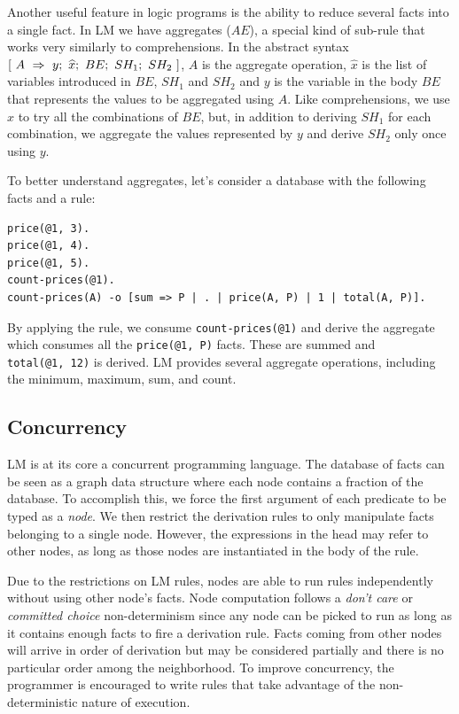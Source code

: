 Another useful feature in logic programs is the ability to reduce several facts into a single fact.
In LM we have aggregates ($AE$), a special kind of sub-rule that works very similarly to comprehensions.
In the abstract syntax $[~A~\Rightarrow~y;~\widehat{x};~BE;~SH_1;~SH_2~]$, $A$ is the aggregate operation, $\widehat{x}$ is the list of variables
introduced in $BE$, $SH_1$ and $SH_2$ and $y$ is the variable in the body
$BE$ that represents the values to be aggregated using $A$. Like comprehensions,
we use $\widehat{x}$ to try all the combinations of $BE$, but, in addition to deriving $SH_1$ for each combination,
we aggregate the values represented by $y$ and derive $SH_2$ only once using $y$.

To better understand aggregates, let's consider a database with the following facts and a rule:

\begin{Verbatim}
price(@1, 3).
price(@1, 4).
price(@1, 5).
count-prices(@1).
count-prices(A) -o [sum => P | . | price(A, P) | 1 | total(A, P)].
\end{Verbatim}

By applying the rule, we consume \texttt{count-prices(@1)} and
derive the aggregate which consumes all the \texttt{price(@1, P)} facts.
These are summed and \texttt{total(@1,~12)} is derived.  
LM provides several aggregate operations, including the minimum, maximum, sum, and count.

\subsection{Concurrency}

LM is at its core a concurrent programming language.
The database of facts can be seen as a graph data structure where each node contains a fraction of the database.
To accomplish this, we force the first argument of each predicate to be typed as a \emph{node}. We then
restrict the derivation rules to only manipulate facts belonging to a single node.
However, the expressions in the head may refer to other nodes, as long as those nodes are instantiated in the body of the rule.

Due to the restrictions on LM rules, nodes are able to
run rules independently without using other node's facts. Node computation follows a
\emph{don't care} or \emph{committed choice} non-determinism
since any node can be picked to run as long as it contains enough facts to fire a derivation rule.
Facts coming from other nodes will arrive in order of derivation but may be considered
partially and there is no particular order among the neighborhood. To improve concurrency,
the programmer is encouraged to write rules that take advantage of the non-deterministic nature of execution.

